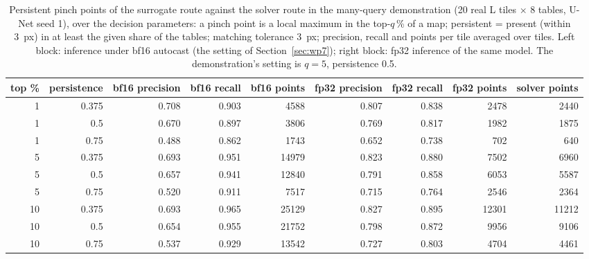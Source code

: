 \begin{table}[htbp]
\centering
\scriptsize
\setlength{\tabcolsep}{3.5pt}
\caption{Persistent pinch points of the surrogate route against the solver route in the many-query demonstration (20 real L tiles $\times$ 8 tables, U-Net seed 1), over the decision parameters: a pinch point is a local maximum in the top-$q$\,\% of a map; persistent = present (within 3~px) in at least the given share of the tables; matching tolerance 3~px; precision, recall and points per tile averaged over tiles. Left block: inference under bf16 autocast (the setting of Section~\ref{sec:wp7}); right block: fp32 inference of the same model. The demonstration's setting is $q=5$, persistence 0.5.}
\label{tab:decision}
\begin{tabular}{rrrrrrrrr}
\toprule
top \% & persistence & bf16 precision & bf16 recall & bf16 points & fp32 precision & fp32 recall & fp32 points & solver points \\
\midrule
1 & 0.375 & 0.708 & 0.903 & 4588 & 0.807 & 0.838 & 2478 & 2440 \\
1 & 0.5 & 0.670 & 0.897 & 3806 & 0.769 & 0.817 & 1982 & 1875 \\
1 & 0.75 & 0.488 & 0.862 & 1743 & 0.652 & 0.738 & 702 & 640 \\
5 & 0.375 & 0.693 & 0.951 & 14979 & 0.823 & 0.880 & 7502 & 6960 \\
5 & 0.5 & 0.657 & 0.941 & 12840 & 0.791 & 0.858 & 6053 & 5587 \\
5 & 0.75 & 0.520 & 0.911 & 7517 & 0.715 & 0.764 & 2546 & 2364 \\
10 & 0.375 & 0.693 & 0.965 & 25129 & 0.827 & 0.895 & 12301 & 11212 \\
10 & 0.5 & 0.654 & 0.955 & 21752 & 0.798 & 0.872 & 9956 & 9106 \\
10 & 0.75 & 0.537 & 0.929 & 13542 & 0.727 & 0.803 & 4704 & 4461 \\
\bottomrule
\end{tabular}
\end{table}
